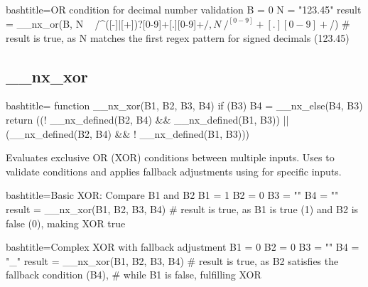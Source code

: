 \begin{NexCodeBox}{bash}{title={OR condition for decimal number validation}}
	B = 0
	N = "123.45"
	result = __nx_or(B, N ~ /^([-]|[+])?[0-9]+[.][0-9]+$/, N ~ /^[0-9]+[.][0-9]+$/)
	# result is true, as N matches the first regex pattern for signed decimals (123.45)
\end{NexCodeBox}

\newpage
\subsection{__nx_xor}
\label{__nx_xor}
\begin{NexCodeBox}{bash}{title={}}
function __nx_xor(B1, B2, B3, B4) {
	if (B3)
		B4 = __nx_else(B4, B3)
	return ((! __nx_defined(B2, B4) && __nx_defined(B1, B3)) || (__nx_defined(B2, B4) && ! __nx_defined(B1, B3)))
}
\end{NexCodeBox}

\begin{NexMainBox}
	\begin{NexMainBox}
		Evaluates exclusive OR (XOR) conditions between multiple inputs. Uses  to validate conditions and applies fallback adjustments using  for specific inputs.
	\end{NexMainBox}
	\begin{NexMainBox}
		\begin{NexListDark}
		\end{NexListDark}
	\end{NexMainBox}
\end{NexMainBox}

\begin{NexCodeBox}{bash}{title={Basic XOR: Compare B1 and B2}}
	B1 = 1
	B2 = 0
	B3 = ""
	B4 = ""
	result = __nx_xor(B1, B2, B3, B4)
	# result is true, as B1 is true (1) and B2 is false (0), making XOR true
\end{NexCodeBox}

\begin{NexCodeBox}{bash}{title={Complex XOR with fallback adjustment}}
	B1 = 0
	B2 = 0
	B3 = ""
	B4 = "_"
	result = __nx_xor(B1, B2, B3, B4)
	# result is true, as B2 satisfies the fallback condition (B4),
	# while B1 is false, fulfilling XOR
\end{NexCodeBox}

